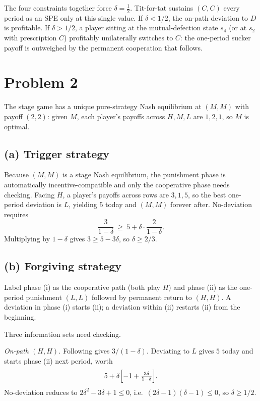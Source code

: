 \documentclass[11pt]{article}
\begin{document}
\smallskip
The four constraints together force $\delta = \tfrac{1}{2}$. Tit-for-tat sustains $(C,C)$ every period as an SPE only at this single value. If $\delta<1/2$, the on-path deviation to $D$ is profitable. If $\delta>1/2$, a player sitting at the mutual-defection state $s_4$ (or at $s_2$ with prescription $C$) profitably unilaterally switches to $C$: the one-period sucker payoff is outweighed by the permanent cooperation that follows.

\section*{Problem 2}

The stage game has a unique pure-strategy Nash equilibrium at $(M,M)$ with payoff $(2,2)$: given $M$, each player's payoffs across $H,M,L$ are $1,2,1$, so $M$ is optimal.

\subsection*{(a) Trigger strategy}

Because $(M,M)$ is a stage Nash equilibrium, the punishment phase is automatically incentive-compatible and only the cooperative phase needs checking. Facing $H$, a player's payoffs across rows are $3,1,5$, so the best one-period deviation is $L$, yielding $5$ today and $(M,M)$ forever after. No-deviation requires
\[
\frac{3}{1-\delta}\ \ge\ 5 + \delta\cdot\frac{2}{1-\delta}.
\]
Multiplying by $1-\delta$ gives $3 \ge 5 - 3\delta$, so $\delta \ge 2/3$.

\subsection*{(b) Forgiving strategy}

Label phase (i) as the cooperative path (both play $H$) and phase (ii) as the one-period punishment $(L,L)$ followed by permanent return to $(H,H)$. A deviation in phase (i) starts (ii); a deviation within (ii) restarts (ii) from the beginning.

Three information sets need checking.

\smallskip
\emph{On-path $(H,H)$.} Following gives $3/(1-\delta)$. Deviating to $L$ gives $5$ today and starts phase (ii) next period, worth
\[
5 + \delta\Bigl[-1+\tfrac{3\delta}{1-\delta}\Bigr].
\]
No-deviation reduces to $2\delta^2 - 3\delta + 1 \le 0$, i.e.\ $(2\delta-1)(\delta-1)\le 0$, so $\delta \ge 1/2$.
\end{document}
